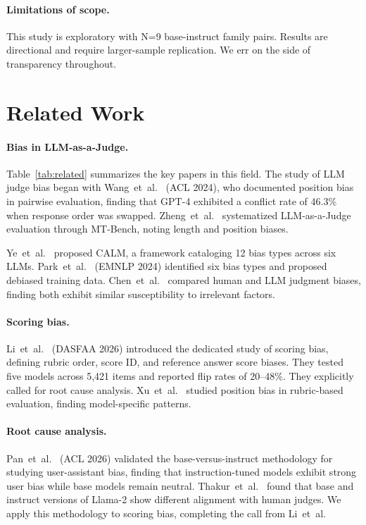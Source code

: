 \documentclass[11pt,preprint,nonatbib]{article}
\begin{document}
\paragraph{Limitations of scope.} This study is exploratory with N=9 base-instruct family pairs. Results are directional and require larger-sample replication. We err on the side of transparency throughout.

\section{Related Work}

\paragraph{Bias in LLM-as-a-Judge.}
Table~\ref{tab:related} summarizes the key papers in this field. The study of LLM judge bias began with Wang~et~al.~\cite{wang2023large} (ACL 2024), who documented position bias in pairwise evaluation, finding that GPT-4 exhibited a conflict rate of 46.3\% when response order was swapped. Zheng~et~al.~\cite{zheng2023judging} systematized LLM-as-a-Judge evaluation through MT-Bench, noting length and position biases.

Ye~et~al.~\cite{ye2024justice} proposed CALM, a framework cataloging 12 bias types across six LLMs. Park~et~al.~\cite{park2024offsetbias} (EMNLP 2024) identified six bias types and proposed debiased training data. Chen~et~al.~\cite{chen2024humans} compared human and LLM judgment biases, finding both exhibit similar susceptibility to irrelevant factors.

\paragraph{Scoring bias.}
Li~et~al.~\cite{li2025scoring} (DASFAA 2026) introduced the dedicated study of scoring bias, defining rubric order, score ID, and reference answer score biases. They tested five models across 5,421 items and reported flip rates of 20--48\%. They explicitly called for root cause analysis. Xu~et~al.~\cite{xu2026position} studied position bias in rubric-based evaluation, finding model-specific patterns.

\paragraph{Root cause analysis.}
Pan~et~al.~\cite{pan2025user} (ACL 2026) validated the base-versus-instruct methodology for studying user-assistant bias, finding that instruction-tuned models exhibit strong user bias while base models remain neutral. Thakur~et~al.~\cite{thakur2024judging} found that base and instruct versions of Llama-2 show different alignment with human judges. We apply this methodology to scoring bias, completing the call from Li~et~al.
\end{document}
